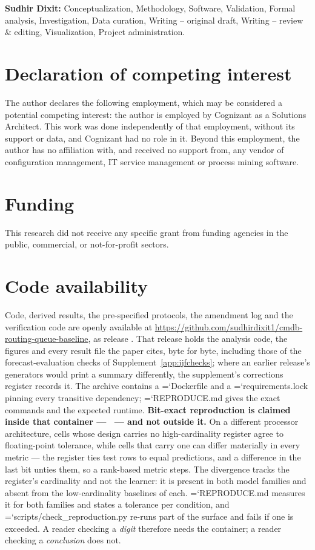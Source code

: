 \documentclass[11pt,3p,review,authoryear]{elsarticle}
\DeclareRobustCommand\texttt[1]{%
  {\ttfamily\hyphenchar\font=`\-\relax #1}}
\theoremstyle{definition}
\begin{document}
\textbf{Sudhir Dixit:} Conceptualization, Methodology, Software, Validation,
Formal analysis, Investigation, Data curation, Writing -- original draft,
Writing -- review \& editing, Visualization, Project administration.

\section*{Declaration of competing interest}

The author declares the following employment, which may be considered a
potential competing interest: the author is employed by Cognizant as a
Solutions Architect. This work was done independently of that employment,
without its support or data, and Cognizant had no role in it. Beyond this
employment, the author has no affiliation with, and received no support
from, any vendor of configuration management, IT service management or
process mining software.

\section*{Funding}

This research did not receive any specific grant from funding agencies in
the public, commercial, or not-for-profit sectors.

\section*{Code availability}

Code, derived results, the pre-specified protocols, the amendment log and the
verification code are openly available at
\url{https://github.com/sudhirdixit1/cmdb-routing-queue-baseline}, as release
\releaseTag. That release holds the analysis code, the figures and every
result file the paper cites, byte for byte, including those of the
forecast-evaluation checks of Supplement~\ref{app:ijfchecks}; where an
earlier release's generators would print a summary differently, the
supplement's corrections register records it.
The archive contains a \texttt{Dockerfile} and a \texttt{requirements.lock}
pinning every transitive dependency; \texttt{REPRODUCE.md} gives the exact
commands and the expected runtime. \textbf{Bit-exact reproduction is claimed
inside that container --- \imageDigest\ --- and not outside it.} On a different processor architecture, cells whose design carries no
high-cardinality register agree to floating-point tolerance, while cells that
carry one can differ materially in every metric --- the register ties test
rows to equal predictions, and a difference in the last bit unties them, so a
rank-based metric steps. The divergence tracks the register's cardinality and
not the learner: it is present in both model families and absent from the
low-cardinality baselines of each. \texttt{REPRODUCE.md} measures it for both
families and states a tolerance per condition, and
\texttt{scripts/check\_reproduction.py} re-runs part of the surface and fails
if one is exceeded. A reader checking a \emph{digit} therefore needs the
container; a reader checking a \emph{conclusion} does not.
\end{document}
